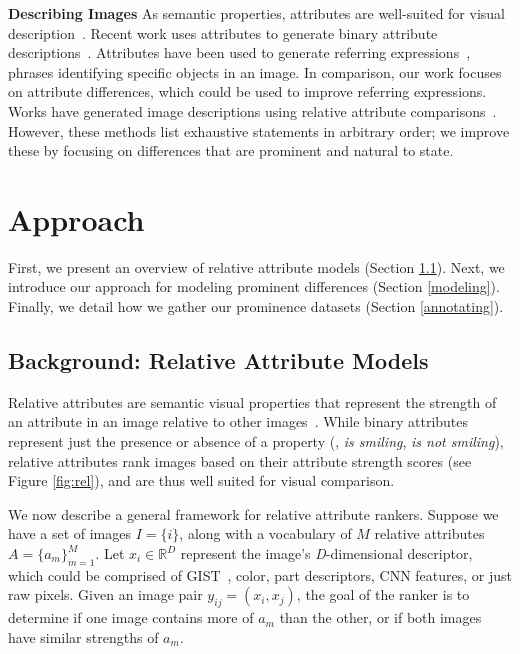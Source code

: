 \documentclass[10pt,twocolumn,letterpaper]{article}
\begin{document}
\vspace{0.25cm}

\noindent \textbf{Describing Images} \hspace{1em} As semantic properties, attributes are well-suited for visual description~\cite{describingobjects, relativeattributes, spokenattributes, dominance, babytalk, referring, referit}. Recent work uses attributes to generate binary attribute descriptions~\cite{describingobjects, babytalk, dominance}. Attributes have been used to generate referring expressions~\cite{referring, referit}, phrases identifying specific objects in an image. In comparison, our work focuses on attribute differences, which could be used to improve referring expressions. Works have generated image descriptions using relative attribute comparisons~\cite{relativeattributes, spokenattributes}. However, these methods list exhaustive statements in arbitrary order; we improve these by focusing on differences that are prominent and natural to state.



\section{Approach} \label{approach}

First, we present an overview of relative attribute models (Section \ref{relativeattributemodels}). Next, we introduce our approach for modeling prominent differences (Section \ref{modeling}). Finally, we detail how we gather our prominence datasets (Section \ref{annotating}).

\subsection{Background: Relative Attribute Models} \label{relativeattributemodels}

Relative attributes are semantic visual properties that represent the strength of an attribute in an image relative to other images~\cite{relativeattributes}. While binary attributes represent just the presence or absence of a property (\eg, \textit{is smiling}, \textit{is not smiling}), relative attributes rank images based on their attribute strength scores (see Figure \ref{fig:rel}), and are thus well suited for visual comparison.

We now describe a general framework for relative attribute rankers. Suppose we have a set of images $I = \{i\}$, along with a vocabulary of $M$ relative attributes $A = \{a_m\}_{m=1}^M$. Let $x_i \in \mathbb{R}^D$ represent the image's \textit{D}-dimensional descriptor, which could be comprised of GIST~\cite{gist}, color, part descriptors, CNN features, or just raw pixels. Given an image pair $y_{ij} = (x_i, x_j)$, the goal of the ranker is to determine if one image contains more of $a_m$ than the other, or if both images have similar strengths of $a_m$.
\end{document}
